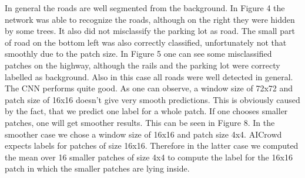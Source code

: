 \documentclass[10pt,conference,compsocconf]{IEEEtran}
\begin{document}
In general the roads are well segmented from the background. In Figure 4 the network was able to recognize the roads, although on the right they were hidden by some trees. It also did not misclassify the parking lot as road. The small part of road on the bottom left was also correctly classified, unfortunately not that smoothly due to the patch size. In Figure 5 one can see some misclassified patches on the highway, although the rails and the parking lot were correcty labelled as background. Also in this case all roads were well detected in general. The CNN performs quite good. As one can observe, a window size of 72x72 and patch size of 16x16 doesn't give very smooth predictions. This is obviously caused by the fact, that we predict one label for a whole patch. If one chooses smaller patches, one will get smoother results. This can be seen in Figure 8. In the smoother case we chose a window size of 16x16 and patch size 4x4. AICrowd expects labels for patches of size 16x16. Therefore in the latter case we computed the mean over 16 smaller patches of size 4x4 to compute the label for the 16x16 patch in which the smaller patches are lying inside. 
\end{document}
